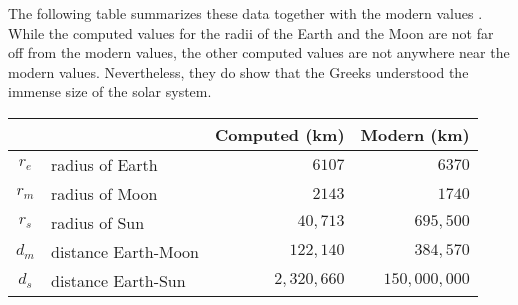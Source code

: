The following table summarizes these data together with the modern values \cite[Table~1.3]{hahn-cic}. While the computed values for the radii of the Earth and the Moon are not far off from the modern values, the other computed values are not anywhere near the modern values. Nevertheless, they do show that the Greeks understood the immense size of the solar system.\label{p.table1}
\begin{center}
\begin{tabular}{|cl|r|r|}
\hline
\multicolumn{2}{|c|}{}&Computed (km)&Modern (km)\\
\hline\hline
$r_e$&radius of Earth& $6107$   & $6370$\\
$r_m$&radius of Moon&  $2143$   & $1740$\\
$r_s$&radius of Sun&   $40,713$ & $695,500$\\
$d_m$&distance Earth-Moon& $122,140$   & $384,570$\\
$d_s$&distance Earth-Sun&  $2,320,660$ & $150,000,000$\\
\hline
\end{tabular}
\end{center}
